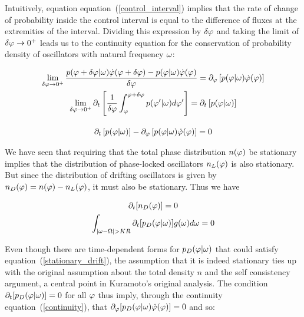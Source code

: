 Intuitively, equation equation~(\ref{control_interval}) implies that the rate of change of probability inside the control interval is
equal to the difference of fluxes at the extremities of the interval. Dividing this expression by $\delta\varphi$ and taking the
limit of $\delta\varphi \to 0^+$ leads us to the continuity equation for the conservation of probability density of oscillators with
natural frequency $\omega$:

\begin{gather}
    \lim_{\delta\varphi \to 0^+} \frac{p(\varphi+\delta\varphi | \omega)\dot{\varphi}(\varphi+\delta\varphi) - p(\varphi | \omega)\dot{\varphi}(\varphi)}{\delta\varphi} = \partial_\varphi \left[ p(\varphi | \omega) \dot{\varphi}(\varphi) \right]  \notag\\
    \lim_{\delta\varphi \to 0^+} \partial_t \left[ \frac{1}{\delta\varphi}\int_{\varphi}^{\varphi + \delta \varphi} p(\varphi' | \omega) d\varphi' \right] = \partial_t \left[ p(\varphi | \omega) \right] \notag\\[10pt]
    \partial_t \left[ p(\varphi | \omega) \right] - \partial_\varphi \left[ p(\varphi | \omega) \dot{\varphi}(\varphi) \right] = 0
    \label{continuity}
\end{gather}

We have seen that requiring that the total phase distribution $n(\varphi)$ be stationary implies that the distribution of
phase-locked oscillators $n_L(\varphi)$ is also stationary. But since the distribution of drifting oscillators is given by
$n_D(\varphi) = n(\varphi) - n_L(\varphi)$, it must also be stationary. Thus we have

\begin{gather}
    \partial_t [ n_D(\varphi) ] = 0\notag\\
    \int_{|\omega - \Omega| > K R} \partial_t [ p_D(\varphi | \omega)] g(\omega) d\omega = 0
    \label{stationary_drift}
\end{gather}

Even though there are time-dependent forms for $p_D(\varphi | \omega)$ that could satisfy equation~(\ref{stationary_drift}), the
assumption that it is indeed stationary ties up with the original assumption about the total density $n$ and the self consistency
argument, a central point in Kuramoto's original analysis. The condition $\partial_t [p_D(\varphi | \omega)]=0$ for all $\varphi$
thus imply, through the continuity equation~(\ref{continuity}), that $\partial_\varphi [p_D(\varphi |
\omega)\dot{\varphi}(\varphi)]=0$ and so:

